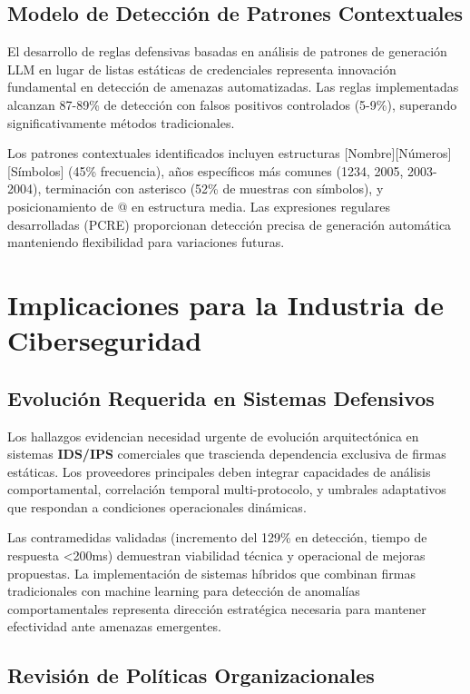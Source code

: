 \subsection{Modelo de Detección de Patrones Contextuales}

El desarrollo de reglas defensivas basadas en análisis de patrones de generación LLM en lugar de listas estáticas de credenciales representa innovación fundamental en detección de amenazas automatizadas. Las reglas implementadas alcanzan 87-89\% de detección con falsos positivos controlados (5-9\%), superando significativamente métodos tradicionales.

Los patrones contextuales identificados incluyen estructuras [Nombre][Números][Símbolos] (45\% frecuencia), años específicos más comunes (1234, 2005, 2003-2004), terminación con asterisco (52\% de muestras con símbolos), y posicionamiento de @ en estructura media. Las expresiones regulares desarrolladas (PCRE) proporcionan detección precisa de generación automática manteniendo flexibilidad para variaciones futuras.

\section{Implicaciones para la Industria de Ciberseguridad}

\subsection{Evolución Requerida en Sistemas Defensivos}

Los hallazgos evidencian necesidad urgente de evolución arquitectónica en sistemas \textbf{IDS/IPS} comerciales que trascienda dependencia exclusiva de firmas estáticas. Los proveedores principales deben integrar capacidades de análisis comportamental, correlación temporal multi-protocolo, y umbrales adaptativos que respondan a condiciones operacionales dinámicas.

Las contramedidas validadas (incremento del 129\% en detección, tiempo de respuesta <200ms) demuestran viabilidad técnica y operacional de mejoras propuestas. La implementación de sistemas híbridos que combinan firmas tradicionales con machine learning para detección de anomalías comportamentales representa dirección estratégica necesaria para mantener efectividad ante amenazas emergentes.

\subsection{Revisión de Políticas Organizacionales}

